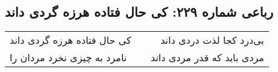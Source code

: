\begin{center}
\section*{رباعی شماره ۲۲۹: کی حال فتاده هرزه گردی داند}
\label{sec:sh229}
\begin{longtable}{l p{0.5cm} r}
کی حال فتاده هرزه گردی داند
&&
بی‌درد کجا لذت دردی داند
\\
نامرد به چیزی نخرد مردان را
&&
مردی باید که قدر مردی داند
\\
\end{longtable}
\end{center}

